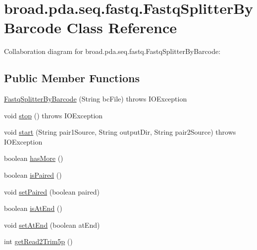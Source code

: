\hypertarget{classbroad_1_1pda_1_1seq_1_1fastq_1_1_fastq_splitter_by_barcode}{\section{broad.\+pda.\+seq.\+fastq.\+Fastq\+Splitter\+By\+Barcode Class Reference}
\label{classbroad_1_1pda_1_1seq_1_1fastq_1_1_fastq_splitter_by_barcode}
}


Collaboration diagram for broad.\+pda.\+seq.\+fastq.\+Fastq\+Splitter\+By\+Barcode\+:
\subsection*{Public Member Functions}
\begin{DoxyCompactItemize}
\item 
\hyperlink{classbroad_1_1pda_1_1seq_1_1fastq_1_1_fastq_splitter_by_barcode_a797199923a74ffbaf852ce4447b4401d}{Fastq\+Splitter\+By\+Barcode} (String bc\+File)  throws I\+O\+Exception 
\item 
void \hyperlink{classbroad_1_1pda_1_1seq_1_1fastq_1_1_fastq_splitter_by_barcode_a0c70f0b3af633811c92a7cbaa76e7b10}{stop} ()  throws I\+O\+Exception 
\item 
void \hyperlink{classbroad_1_1pda_1_1seq_1_1fastq_1_1_fastq_splitter_by_barcode_a849b97d6101918f8c0da871f0a3f4c1f}{start} (String pair1\+Source, String output\+Dir, String pair2\+Source)  throws I\+O\+Exception 
\item 
boolean \hyperlink{classbroad_1_1pda_1_1seq_1_1fastq_1_1_fastq_splitter_by_barcode_a14446a64d96b2c239d539ac5c6f56492}{has\+More} ()
\item 
boolean \hyperlink{classbroad_1_1pda_1_1seq_1_1fastq_1_1_fastq_splitter_by_barcode_abf92378a2b0e63fe01228f308ff0cdd4}{is\+Paired} ()
\item 
void \hyperlink{classbroad_1_1pda_1_1seq_1_1fastq_1_1_fastq_splitter_by_barcode_afa31dea38fbcd4ed5f0398047280abfc}{set\+Paired} (boolean paired)
\item 
boolean \hyperlink{classbroad_1_1pda_1_1seq_1_1fastq_1_1_fastq_splitter_by_barcode_a86ab85f75aad995a5c10e162585c0218}{is\+At\+End} ()
\item 
void \hyperlink{classbroad_1_1pda_1_1seq_1_1fastq_1_1_fastq_splitter_by_barcode_a33b25a986c4cbcc33d87d383c072fc0e}{set\+At\+End} (boolean at\+End)
\item 
int \hyperlink{classbroad_1_1pda_1_1seq_1_1fastq_1_1_fastq_splitter_by_barcode_a3536f1626889354dd010de2206fbc32b}{get\+Read2\+Trim5p} ()

\end{DoxyCompactItemize}
